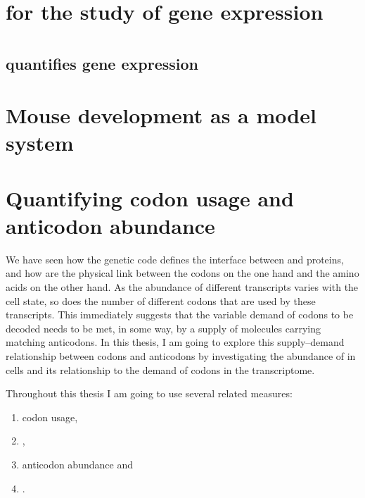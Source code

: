 \section{ for the study of gene expression}

\section{}

\subsection{ quantifies  gene expression}

\section{Mouse development as a model system}

\section{Quantifying codon usage and anticodon abundance}


We have seen how the genetic code defines the interface between \mrna and
proteins, and how \trna[s] are the physical link between the codons on the one
hand and the amino acids on the other hand. As the abundance of different \mrna
transcripts varies with the cell state, so does the number of different codons
that are used by these transcripts. This immediately suggests that the variable
demand of codons to be decoded needs to be met, in some way, by a supply of
\trna molecules carrying matching anticodons. In this thesis, I am going to
explore this supply--demand relationship between codons and anticodons by
investigating the abundance of \trna[s] in cells and its relationship to the
demand of codons in the \mrna transcriptome.

Throughout this thesis I am going to use several related measures:

\begin{enumerate}
    \item codon usage,
    \item \rcu,
    \item anticodon abundance and
    \item \raa.
\end{enumerate}

